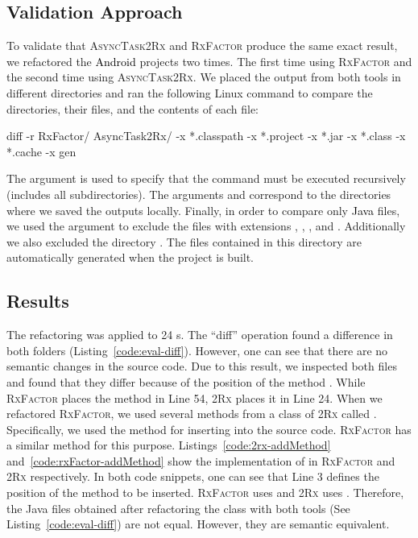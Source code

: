 \documentclass[type=bsc,accentcolor=tud9c]{tudthesis}
\newcommand{\framework}[1]{\textcolor{black}{#1}}
\newcommand{\toolcore}{\textsc{2Rx}}
\newcommand{\toolrxfactor}{\textsc{AsyncTask2Rx}}
\begin{document}
\subsection{Validation Approach}
To validate that \toolrxfactor{} and \textsc{RxFactor} produce the same exact result, we refactored the \framework{Android} projects two times. The first time using \textsc{RxFactor} and the second time using \toolrxfactor{}. We placed the output from both tools in different directories and ran the following Linux command to compare the directories, their files, and the contents of each file:

\begin{textcode}{}
diff -r RxFactor/ AsyncTask2Rx/ -x *.classpath -x *.project -x *.jar -x *.class -x *.cache -x gen
\end{textcode}

The argument  is used to specify that the command must be executed recursively (includes all subdirectories). The arguments  and  correspond to the directories where we saved the outputs locally. Finally, in order to compare only \framework{Java} files, we used the argument  to exclude the files with extensions , , ,  and . Additionally we also excluded the directory . The files contained in this directory are automatically generated when the project is built.

\subsection{Results}
The refactoring was applied to 24 s. The ``diff'' operation found a difference in both folders (Listing~\ref{code:eval-diff}). However, one can see that there are no semantic changes in the source code. Due to this result, we inspected both files and found that they differ because of the position of the method . While \textsc{RxFactor} places the method  in Line 54, \toolcore{} places it in Line 24. When we refactored \textsc{RxFactor}, we used several methods from a class of \toolcore{} called . Specifically, we used the method  for inserting  into the source code. \textsc{RxFactor} has a similar method for this purpose. Listings~\ref{code:2rx-addMethod} and~\ref{code:rxFactor-addMethod} show the implementation of  in \textsc{RxFactor} and \toolcore{} respectively. In both code snippets, one can see that Line 3 defines the position of the method to be inserted. \textsc{RxFactor} uses  and \toolcore{} uses . Therefore, the Java files obtained after refactoring the class  with both tools (See Listing~\ref{code:eval-diff}) are not equal. However, they are semantic equivalent.
\end{document}
